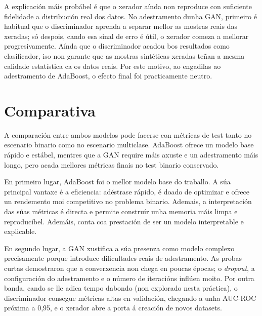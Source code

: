 \documentclass[12pt,a4paper]{article}
\begin{document}
A explicación máis probábel é que o xerador aínda non reproduce con suficiente
fidelidade a distribución real dos datos. No adestramento dunha GAN, primeiro
é habitual que o discriminador aprenda a separar mellor as mostras reais das
xeradas; só despois, cando esa sinal de erro é útil, o xerador comeza a
mellorar progresivamente. Aínda que o discriminador acadou bos resultados como
clasificador, iso non garante que as mostras sintéticas xeradas teñan a mesma
calidade estatística ca os datos reais. Por este motivo, ao engadilas ao
adestramento de AdaBoost, o efecto final foi practicamente neutro.

\section{Comparativa}

A comparación entre ambos modelos pode facerse con métricas de test tanto no
escenario binario como no escenario multiclase. AdaBoost ofrece un modelo base rápido e estábel, mentres
que a GAN require máis axuste e un adestramento máis longo, pero acada mellores
métricas finais no test binario conservado.

En primeiro lugar, AdaBoost foi o mellor modelo base do traballo. A súa principal vantaxe é a eficiencia: adéstrase rápido, é doado de 
optimizar e ofrece un rendemento moi competitivo no problema binario. Ademais, a interpretación das súas métricas é directa e permite construír 
unha memoria máis limpa e reproducíbel. Ademáis, conta coa prestación de ser un modelo interpretable e explicable.

En segundo lugar, a GAN xustifica a súa presenza como modelo complexo precisamente porque introduce dificultades reais de adestramento. 
As probas curtas demostraron que a converxencia non chega en poucas épocas; o \emph{dropout}, a configuración do adestramento e o número de iteracións inflúen 
moito. Por outra banda, cando se lle adica tempo dabondo (non explorado nesta práctica), o discriminador consegue
métricas altas en validación, chegando a unha AUC-ROC próxima a 0,95, e o
xerador abre a porta á creación de novos datasets. 

\begin{table}[H]
\centering
\small
{}
\caption{Comparativa cuantitativa no escenario binario sobre test}
\end{table}
\end{document}
